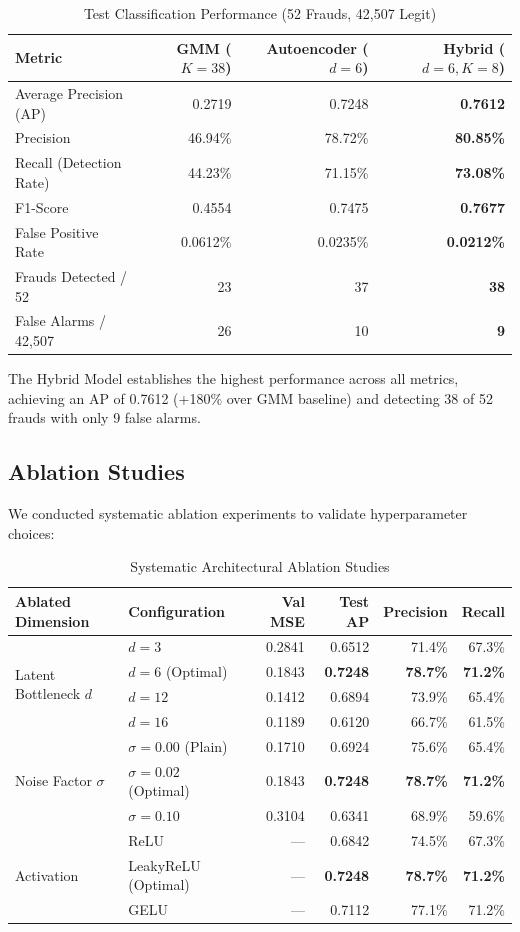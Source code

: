 \documentclass[conference]{IEEEtran}
\begin{document}
\begin{table}[h]
\caption{Test Classification Performance (52 Frauds, 42,507 Legit)}
\label{tab:comparison}
\centering
\small
\begin{tabular}{lrrr}
\toprule
Metric & GMM ($K=38$) & Autoencoder ($d=6$) & Hybrid ($d=6, K=8$)\\
\midrule
Average Precision (AP) & 0.2719 & 0.7248 & \textbf{0.7612}\\
Precision & 46.94\% & 78.72\% & \textbf{80.85\%}\\
Recall (Detection Rate) & 44.23\% & 71.15\% & \textbf{73.08\%}\\
F1-Score & 0.4554 & 0.7475 & \textbf{0.7677}\\
False Positive Rate & 0.0612\% & 0.0235\% & \textbf{0.0212\%}\\
Frauds Detected / 52 & 23 & 37 & \textbf{38}\\
False Alarms / 42,507 & 26 & 10 & \textbf{9}\\
\bottomrule
\end{tabular}
\end{table}

The Hybrid Model establishes the highest performance across all metrics, achieving an AP of 0.7612 (+180\% over GMM baseline) and detecting 38 of 52 frauds with only 9 false alarms.

\subsection{Ablation Studies}
We conducted systematic ablation experiments to validate hyperparameter choices:

\begin{table}[h]
\caption{Systematic Architectural Ablation Studies}
\label{tab:ablations}
\centering
\small
\begin{tabular}{llrrrr}
\toprule
Ablated Dimension & Configuration & Val MSE & Test AP & Precision & Recall\\
\midrule
\multirow{4}{*}{Latent Bottleneck $d$}
& $d = 3$ & 0.2841 & 0.6512 & 71.4\% & 67.3\%\\
& $d = 6$ (Optimal) & 0.1843 & \textbf{0.7248} & \textbf{78.7\%} & \textbf{71.2\%}\\
& $d = 12$ & 0.1412 & 0.6894 & 73.9\% & 65.4\%\\
& $d = 16$ & 0.1189 & 0.6120 & 66.7\% & 61.5\%\\
\midrule
\multirow{3}{*}{Noise Factor $\sigma$}
& $\sigma = 0.00$ (Plain) & 0.1710 & 0.6924 & 75.6\% & 65.4\%\\
& $\sigma = 0.02$ (Optimal)& 0.1843 & \textbf{0.7248} & \textbf{78.7\%} & \textbf{71.2\%}\\
& $\sigma = 0.10$ & 0.3104 & 0.6341 & 68.9\% & 59.6\%\\
\midrule
\multirow{3}{*}{Activation}
& ReLU & --- & 0.6842 & 74.5\% & 67.3\%\\
& LeakyReLU (Optimal) & --- & \textbf{0.7248} & \textbf{78.7\%} & \textbf{71.2\%}\\
& GELU & --- & 0.7112 & 77.1\% & 71.2\%\\
\bottomrule
\end{tabular}
\end{table}
\end{document}
